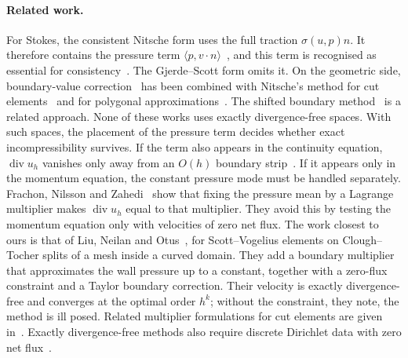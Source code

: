 \paragraph{Related work.}
For Stokes, the consistent Nitsche form uses the full traction $\sigma(u,p)n$. It therefore contains the pressure term $\langle p,v\cdot n\rangle$~\cite{FreundStenberg1995,Stenberg1995,Becker2002,BurmanHansbo2014}, and this term is recognised as essential for consistency~\cite{BurmanHansboLarson2019Stokes}. The Gjerde--Scott form omits it. On the geometric side, boundary-value correction~\cite{BrambleDupontThomee1972} has been combined with Nitsche's method for cut elements~\cite{BurmanHansboLarson2018,BurmanHansboLarson2019Stokes} and for polygonal approximations~\cite{DupontGuzmanScott2025}. The shifted boundary method~\cite{MainScovazzi2018} is a related approach. None of these works uses exactly divergence-free spaces.
With such spaces, the placement of the pressure term decides whether exact incompressibility survives. If the term also appears in the continuity equation, $\operatorname{div}u_h$ vanishes only away from an $O(h)$ boundary strip~\cite{LiuNeilanOlshanskii2023}. If it appears only in the momentum equation, the constant pressure mode must be handled separately. Frachon, Nilsson and Zahedi~\cite{FrachonNilssonZahedi2024} show that fixing the pressure mean by a Lagrange multiplier makes $\operatorname{div}u_h$ equal to that multiplier. They avoid this by testing the momentum equation only with velocities of zero net flux. The work closest to ours is that of Liu, Neilan and Otus~\cite{LiuNeilanOtus2023}, for Scott--Vogelius elements on Clough--Tocher splits of a mesh inside a curved domain. They add a boundary multiplier that approximates the wall pressure up to a constant, together with a zero-flux constraint and a Taylor boundary correction. Their velocity is exactly divergence-free and converges at the optimal order $h^k$; without the constraint, they note, the method is ill posed. Related multiplier formulations for cut elements are given in~\cite{BurmanHansboLarson2024}. Exactly divergence-free methods also require discrete Dirichlet data with zero net flux~\cite{EickmannScottTscherpel2025}.

